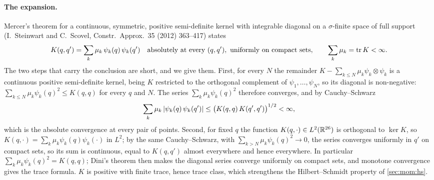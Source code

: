 \paragraph{The expansion.}
Mercer's theorem for a continuous, symmetric, positive semi-definite kernel with integrable diagonal on a $\sigma$-finite space of full support (I.~Steinwart and C.~Scovel, Constr.\ Approx.\ 35 (2012) 363--417) states
\begin{equation}
  \label{eq:mom:mercer}
  K(q, q')
    = \sum_k \mu_k \, \psi_k(q) \, \psi_k(q')
  \quad
  \text{absolutely at every } (q, q'), \text{ uniformly on compact sets},
  \qquad
  \sum_k \mu_k
    = \operatorname{tr} K
    < \infty.
\end{equation}
The two steps that carry the conclusion are short, and we give them.
First, for every $N$ the remainder $K - \sum_{k \le N} \mu_k \psi_k \otimes \psi_k$ is a continuous positive semi-definite kernel, being $K$ restricted to the orthogonal complement of $\psi_1, \ldots, \psi_N$, so its diagonal is non-negative: $\sum_{k \le N} \mu_k \psi_k(q)^2 \le K(q, q)$ for every $q$ and $N$.
The series $\sum_k \mu_k \psi_k(q)^2$ therefore converges, and by Cauchy--Schwarz
\begin{equation}
  \label{eq:mom:absolute}
  \sum_k \mu_k \, {|\psi_k(q) \, \psi_k(q')|}
    \le \big( K(q, q) \, K(q', q') \big)^{1/2}
    < \infty,
\end{equation}
which is the absolute convergence at every pair of points.
Second, for fixed $q$ the function $K(q, \cdot) \in L^2(\mathbb{R}^{26})$ is orthogonal to $\ker K$, so $K(q, \cdot) = \sum_k \mu_k \psi_k(q) \psi_k(\cdot)$ in $L^2$; by the same Cauchy--Schwarz, with $\sum_{k > N} \mu_k \psi_k(q)^2 \to 0$, the series converges uniformly in $q'$ on compact sets, so its sum is continuous, equal to $K(q, q')$ almost everywhere and hence everywhere.
In particular $\sum_k \mu_k \psi_k(q)^2 = K(q, q)$; Dini's theorem then makes the diagonal series converge uniformly on compact sets, and monotone convergence gives the trace formula.
$K$ is positive with finite trace, hence trace class, which strengthens the Hilbert--Schmidt property of \cref{sec:mom:hs}.

